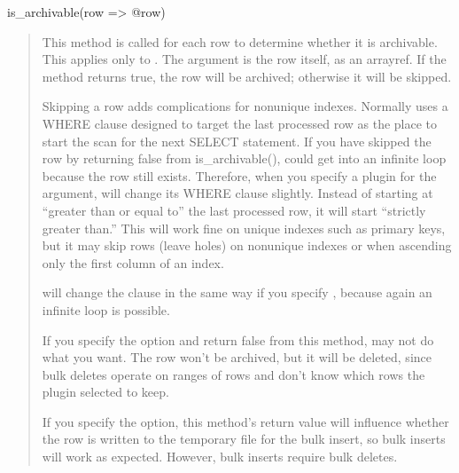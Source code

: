 \documentclass[letterpaper,10pt,english]{sphinxmanual}
\begin{document}
is\_archivable(row =\textgreater{} @row)
\begin{quote}

This method is called for each row to determine whether it is archivable.  This
applies only to {\hyperref[\detokenize{mariadb-archiver:cmdoption-mariadb-archiver-source}]{}}.  The argument is the row itself, as an arrayref.
If the method returns true, the row will be archived; otherwise it will be
skipped.

Skipping a row adds complications for non\sphinxhyphen{}unique indexes.  Normally
 uses a WHERE clause designed to target the last processed row as
the place to start the scan for the next SELECT statement.  If you have skipped
the row by returning false from is\_archivable(),  could get into
an infinite loop because the row still exists.  Therefore, when you specify a
plugin for the {\hyperref[\detokenize{mariadb-archiver:cmdoption-mariadb-archiver-source}]{}} argument,  will change its WHERE clause
slightly.  Instead of starting at “greater than or equal to” the last processed
row, it will start “strictly greater than.”  This will work fine on unique
indexes such as primary keys, but it may skip rows (leave holes) on non\sphinxhyphen{}unique
indexes or when ascending only the first column of an index.

 will change the clause in the same way if you specify
{\hyperref[\detokenize{mariadb-archiver:cmdoption-mariadb-archiver-no-delete}]{}}, because again an infinite loop is possible.

If you specify the {\hyperref[\detokenize{mariadb-archiver:cmdoption-mariadb-archiver-bulk-delete}]{}} option and return false from this method,
 may not do what you want.  The row won’t be archived, but it will
be deleted, since bulk deletes operate on ranges of rows and don’t know which
rows the plugin selected to keep.

If you specify the {\hyperref[\detokenize{mariadb-archiver:cmdoption-mariadb-archiver-bulk-insert}]{}} option, this method’s return value will
influence whether the row is written to the temporary file for the bulk insert,
so bulk inserts will work as expected.  However, bulk inserts require bulk
deletes.
\end{quote}
\end{document}
